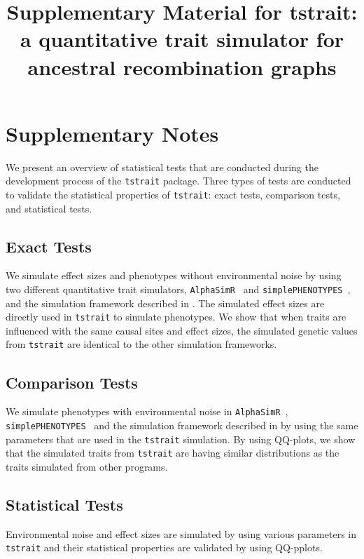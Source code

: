 \documentclass{article}
\title{Supplementary Material for tstrait: a quantitative trait simulator for ancestral recombination graphs}
\date{}
\begin{document}
\maketitle

\section{Supplementary Notes}

We present an overview of statistical tests that are conducted during the development process of the \texttt{tstrait} package. Three types of tests are conducted to validate the statistical properties of \texttt{tstrait}: exact tests, comparison tests, and statistical tests.

\subsection{Exact Tests}

We simulate effect sizes and phenotypes without environmental noise by using two different quantitative trait simulators, \texttt{AlphaSimR}~\citep{gaynor2021} and
\texttt{simplePHENOTYPES}~\citep{fernandes2020}, and the simulation framework described in \citep{zhang2023}. The simulated effect sizes are directly used in \texttt{tstrait} to simulate phenotypes. We show that when traits are influenced with the same causal sites and effect sizes, the simulated genetic values from \texttt{tstrait} are identical to the other simulation frameworks.

\subsection{Comparison Tests}

We simulate phenotypes with environmental noise in \texttt{AlphaSimR}~\citep{gaynor2021},
\texttt{simplePHENOTYPES}~\citep{fernandes2020} and the simulation framework described in \citep{zhang2023} by using the same parameters that are used in the \texttt{tstrait} simulation. By using QQ-plots, we show that the simulated traits from \texttt{tstrait} are having similar distributions as the traits simulated from other programs.

\subsection{Statistical Tests}

Environmental noise and effect sizes are simulated by using various parameters in \texttt{tstrait} and their statistical properties are validated by using QQ-pplots.
\end{document}
